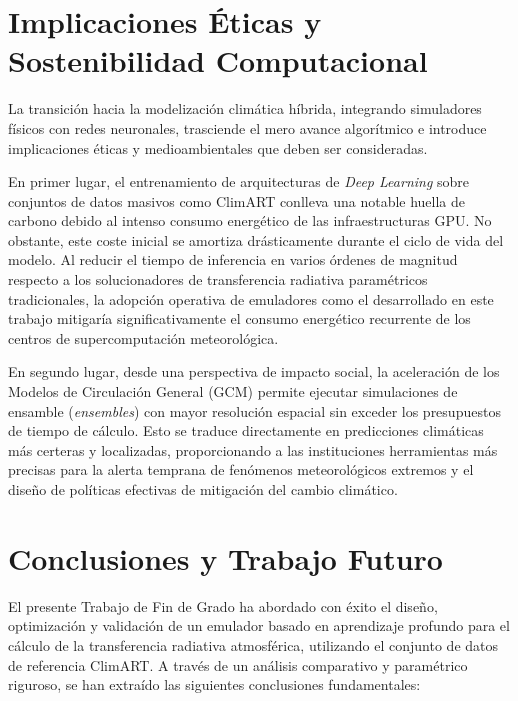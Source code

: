 \documentclass[11pt,a4paper,twoside,pdf]{article}
\numberwithin{equation}{section}
\begin{document}
\section{Implicaciones Éticas y Sostenibilidad Computacional}

La transición hacia la modelización climática híbrida, integrando simuladores físicos con redes neuronales, trasciende el mero avance algorítmico e introduce implicaciones éticas y medioambientales que deben ser consideradas. 

En primer lugar, el entrenamiento de arquitecturas de \textit{Deep Learning} sobre conjuntos de datos masivos como ClimART conlleva una notable huella de carbono debido al intenso consumo energético de las infraestructuras GPU. No obstante, este coste inicial se amortiza drásticamente durante el ciclo de vida del modelo. Al reducir el tiempo de inferencia en varios órdenes de magnitud respecto a los solucionadores de transferencia radiativa paramétricos tradicionales, la adopción operativa de emuladores como el desarrollado en este trabajo mitigaría significativamente el consumo energético recurrente de los centros de supercomputación meteorológica.

En segundo lugar, desde una perspectiva de impacto social, la aceleración de los Modelos de Circulación General (GCM) permite ejecutar simulaciones de ensamble (\textit{ensembles}) con mayor resolución espacial sin exceder los presupuestos de tiempo de cálculo. Esto se traduce directamente en predicciones climáticas más certeras y localizadas, proporcionando a las instituciones herramientas más precisas para la alerta temprana de fenómenos meteorológicos extremos y el diseño de políticas efectivas de mitigación del cambio climático.

\section{Conclusiones y Trabajo Futuro}

El presente Trabajo de Fin de Grado ha abordado con éxito el diseño, optimización y validación de un emulador basado en aprendizaje profundo para el cálculo de la transferencia radiativa atmosférica, utilizando el conjunto de datos de referencia ClimART. A través de un análisis comparativo y paramétrico riguroso, se han extraído las siguientes conclusiones fundamentales:
\end{document}
